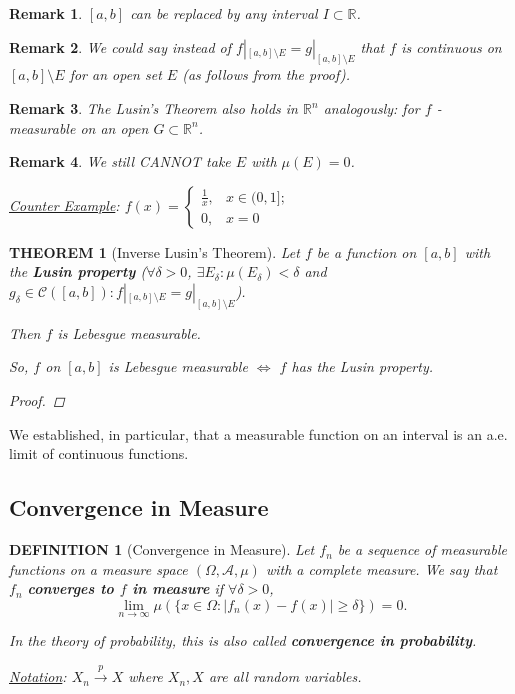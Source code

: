 \documentclass[12pt]{article}
\theoremstyle{blueplain}
\newtheorem{theorem}{THEOREM}[section]
\theoremstyle{bluedef}
\newtheorem{definition}{DEFINITION}[section]
\theoremstyle{blueremark}
\newtheorem{remark}{Remark}[section]
\newcommand{\R}{\mathbb{R}}
\numberwithin{equation}{section}
\begin{document}
\begin{remark}
  $[a,b]$ can be replaced by any interval $I \subset \R$.
\end{remark}

\begin{remark}
  We could say instead of $f|_{[a,b] \setminus E} = g|_{[a,b] \setminus E}$ that $f$ is continuous on $[a,b] \setminus E$ for an open set $E$ (as follows from the proof).
\end{remark}

\begin{remark}
  The Lusin's Theorem also holds in $\R^n$ analogously: for $f$ - measurable on an open $G \subset \R^n$.
\end{remark}

\begin{remark}
  We still CANNOT take $E$ with $\mu(E) = 0$.

  \underline{Counter Example}: $f(x) = \begin{cases} \frac{1}{x}, & x \in (0,1]; \\ 0, & x = 0 \end{cases}$
\end{remark}

\begin{theorem}[Inverse Lusin's Theorem]

  Let $f$ be a function on $[a,b]$ with the \textbf{Lusin property} ($\forall \delta > 0$, $\exists E_\delta : \mu(E_\delta) < \delta$ and $g_\delta \in \mathcal{C}([a,b]): f|_{[a,b] \setminus E} = g|_{[a,b] \setminus E}$).

  Then $f$ is Lebesgue measurable.

  So, $f$ on $[a,b]$ is Lebesgue measurable $\Leftrightarrow$ $f$ has the Lusin property.
  \begin{proof}



  \end{proof}
\end{theorem}


We established, in particular, that a measurable function on an interval is an a.e. limit of continuous functions.


\clearpage

\subsection{Convergence in Measure}

\begin{definition}[Convergence in Measure]

  Let $f_n$ be a sequence of measurable functions on a measure space $(\Omega, \mathcal{A}, \mu)$ with a complete measure. We say that $f_n$ \textbf{converges to $f$ in measure} if $\forall \delta > 0$,
  $$\lim_{n \to \infty} \mu(\{x \in \Omega \colon |f_n(x) - f(x)| \geq \delta\}) = 0.$$

  In the theory of probability, this is also called \textbf{convergence in probability}.

  \underline{Notation}: $X_n \xrightarrow{p} X$ where $X_n, X$ are all random variables.
\end{definition}
\end{document}
